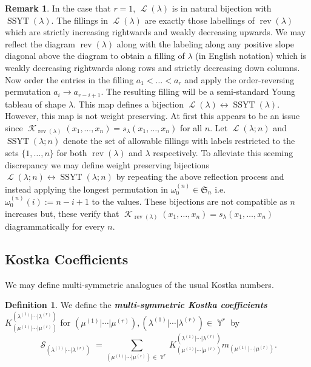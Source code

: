 \documentclass[12pt,reqno]{amsart}
\theoremstyle{definition}
\newtheorem{defn}[thm]{Definition}
\newtheorem{remark}{Remark}
\DeclareMathOperator{\Par}{\mathbb{Y}}
\DeclareMathOperator{\SSYT}{\mathrm{SSYT}}
\DeclareMathOperator{\rev}{rev}
\DeclareMathOperator{\cK}{\mathcal{K}}
\DeclareMathOperator{\cS}{\mathcal{S}}
\DeclareMathOperator{\cL}{\mathcal{L}}
\begin{document}
\begin{remark}
    In the case that $r=1$, $\cL(\lambda)$ is in natural bijection with $\SSYT(\lambda).$ The fillings in $\cL(\lambda)$ are exactly those labellings of $\rev(\lambda)$ which are strictly increasing rightwards and weakly decreasing upwards. We may reflect the diagram $ \rev(\lambda)$ along with the labeling along any positive slope diagonal above the diagram to obtain a filling of $\lambda$ (in English notation) which is weakly decreasing rightwards along rows and strictly decreasing down columns. Now order the entries in the filling $a_1 < \ldots < a_r$ and apply the order-reversing permutation $a_i \rightarrow a_{r-i+1}.$ The resulting filling will be a semi-standard Young tableau of shape $\lambda.$ This map defines a bijection $\cL(\lambda) \leftrightarrow \SSYT(\lambda).$ However, this map is not weight preserving. At first this appears to be an issue since $\cK_{\rev(\lambda)}(x_1,\ldots,x_n) = s_{\lambda}(x_1,\ldots, x_n)$ for all $n$. Let $\cL(\lambda;n)$ and $  \SSYT(\lambda;n)$ denote the set of allowable fillings with labels restricted to the sets $\{1,\ldots, n\}$ for both $\rev(\lambda)$ and $\lambda$ respectively. To alleviate this seeming discrepancy we may define weight preserving bijections $\cL(\lambda;n)\leftrightarrow \SSYT(\lambda;n)$ by repeating the above reflection process and instead applying the longest permutation in $\omega_0^{(n)} \in \mathfrak{S}_n$ i.e. $\omega_0^{(n)}(i):= n-i+1$ to the values. These bijections are not compatible as $n$ increases but, these verify that $\cK_{\rev(\lambda)}(x_1,\ldots,x_n) = s_{\lambda}(x_1,\ldots, x_n)$ diagrammatically for every $n.$
\end{remark}


\subsection{Kostka Coefficients}

We may define multi-symmetric analogues of the usual Kostka numbers. 

\begin{defn}
    We define the \textbf{\textit{multi-symmetric Kostka coefficients}} $K_{(\mu^{(1)}|\cdots|\mu^{(r)})}^{(\lambda^{(1)}|\cdots|\lambda^{(r)})}$ for $(\mu^{(1)}|\cdots|\mu^{(r)}),(\lambda^{(1)}|\cdots|\lambda^{(r)}) \in \Par^r$ by 
    $$\cS_{(\lambda^{(1)}|\cdots|\lambda^{(r)})} = \sum_{(\mu^{(1)}|\cdots|\mu^{(r)}) \in \Par^r} K_{(\mu^{(1)}|\cdots|\mu^{(r)})}^{(\lambda^{(1)}|\cdots|\lambda^{(r)})} m_{(\mu^{(1)}|\cdots|\mu^{(r)})}.$$
\end{defn}
\end{document}
